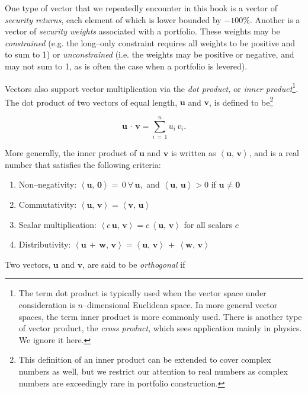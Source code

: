 \documentclass[graybox,envcountchap,sectrefs]{svmono}\usepackage[]{graphicx}\usepackage[]{xcolor}
\begin{document}
\begin{appendices}
One type of vector that we repeatedly encounter in this book is a
vector of \emph{security returns}, each element of which is lower
bounded by $-100\%$. Another is a vector of \emph{security weights}
associated with a portfolio. These weights may be \emph{constrained}
(e.g. the long--only constraint requires all weights to be positive
and to sum to 1) or \emph{unconstrained} (i.e. the weights may be
positive or negative, and may not sum to 1, as is often the case when
a portfolio is levered).

Vectors also support vector multiplication via the \emph{dot product,
}or \emph{inner product}\footnote{The term dot product is typically used when the vector space under
consideration is $n$--dimensional Euclidean space. In more general
vector spaces, the term inner product is more commonly used. There
is another type of vector product, the \emph{cross product}, which
sees application mainly in physics. We ignore it here.}. The dot product of two vectors of equal length, $\mathrm{\mathbf{u}}$
and $\mathrm{\mathbf{v}}$, is defined to be\footnote{This definition of an inner product can be extended to cover complex
numbers as well, but we restrict our attention to real numbers as
complex numbers are exceedingly rare in portfolio construction.}

\begin{equation}
\mathrm{\mathbf{u}}\,\cdotp\,\mathrm{\mathbf{v}}=\sum_{i\,=\,1}^{n}u_{i}\,v_{i}.\label{eq:DotProduct}
\end{equation}

More generally, the inner product of $\mathrm{\mathbf{u}}$ and $\mathrm{\mathbf{v}}$
is written as $\left\langle \mathrm{\mathbf{u}},\,\mathrm{\mathbf{v}}\right\rangle $,
and is a real number that satisfies the following criteria:
\begin{enumerate}
\item Non--negativity: $\mathrm{\mathbf{\left\langle \mathrm{\mathbf{u}},\,\mathrm{\mathbf{0}}\right\rangle =}\,0\ \forall\,\mathrm{\mathbf{u}}},$
and $\left\langle \mathrm{\mathbf{u}},\,\mathrm{\mathbf{u}}\right\rangle >0$
if $\mathrm{\mathbf{u}}\ne\mathbf{0}$
\item Commutativity: $\left\langle \mathrm{\mathbf{u}},\,\mathrm{\mathbf{v}}\right\rangle =\left\langle \mathrm{\mathbf{v}},\,\mathrm{\mathbf{u}}\right\rangle $
\item Scalar multiplication: $\left\langle c\,\mathrm{\mathbf{u}},\,\mathrm{\mathbf{v}}\right\rangle =c\,\left\langle \mathrm{\mathbf{u}},\,\mathrm{\mathbf{v}}\right\rangle $
for all scalars $c$
\item Distributivity: $\left\langle \mathrm{\mathbf{u}\,+\,}\mathbf{w},\,\mathrm{\mathbf{v}}\right\rangle =\left\langle \mathrm{\mathbf{u}},\,\mathrm{\mathbf{v}}\right\rangle \,+\,\left\langle \mathrm{\mathbf{w}},\,\mathrm{\mathbf{v}}\right\rangle $
\end{enumerate}
Two vectors, $\mathrm{\mathbf{u}}$ and $\mathrm{\mathbf{v}}$, are
said to be \emph{orthogonal} if 


\end{appendices}
\end{document}
